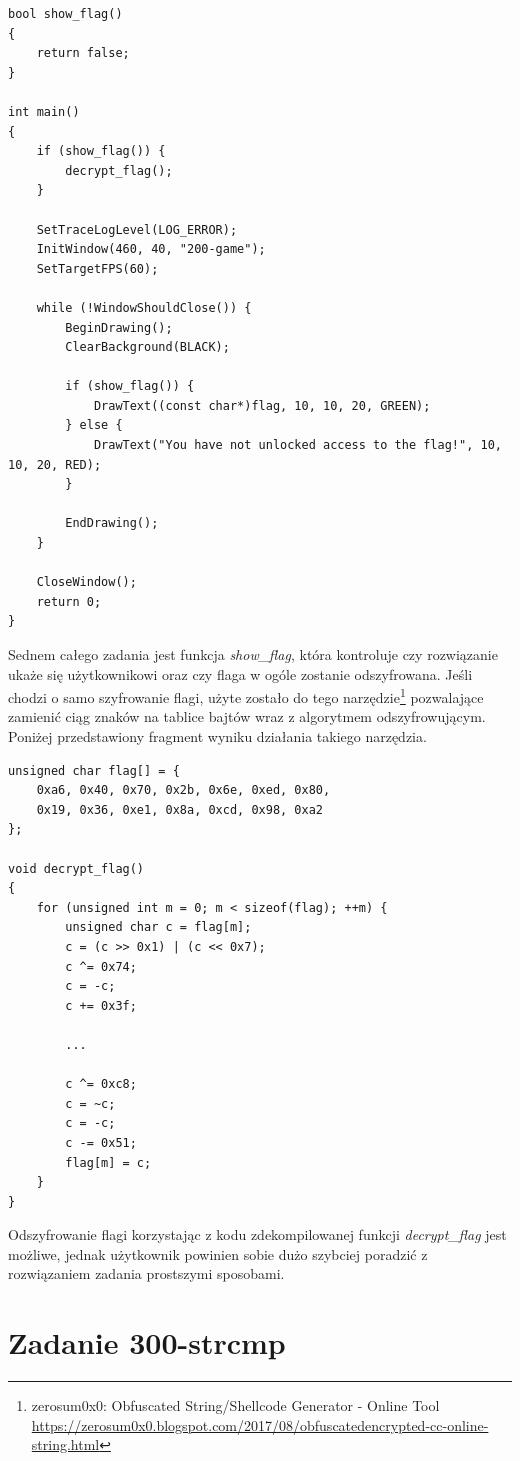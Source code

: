 \documentclass[language=polish,type=eng]{aghmodern}
\begin{document}
\begin{verbatim}
bool show_flag()
{
    return false;
}

int main()
{
    if (show_flag()) {
        decrypt_flag();
    }

    SetTraceLogLevel(LOG_ERROR);
    InitWindow(460, 40, "200-game");
    SetTargetFPS(60);

    while (!WindowShouldClose()) {
        BeginDrawing();
        ClearBackground(BLACK);

        if (show_flag()) {
            DrawText((const char*)flag, 10, 10, 20, GREEN);
        } else {
            DrawText("You have not unlocked access to the flag!", 10, 10, 20, RED);
        }

        EndDrawing();
    }

    CloseWindow();
    return 0;
}
\end{verbatim}

Sednem całego zadania jest funkcja \emph{show\_flag}, która kontroluje czy rozwiązanie
ukaże się użytkownikowi oraz czy flaga w ogóle zostanie odszyfrowana.
Jeśli chodzi o samo szyfrowanie flagi, użyte zostało do tego narzędzie\footnote{
zerosum0x0: Obfuscated String/Shellcode Generator - Online Tool
\url{https://zerosum0x0.blogspot.com/2017/08/obfuscatedencrypted-cc-online-string.html}}
pozwalające zamienić ciąg znaków na tablice bajtów wraz z algorytmem odszyfrowującym.
Poniżej przedstawiony fragment wyniku działania takiego narzędzia.

\begin{verbatim}
unsigned char flag[] = {
    0xa6, 0x40, 0x70, 0x2b, 0x6e, 0xed, 0x80,
    0x19, 0x36, 0xe1, 0x8a, 0xcd, 0x98, 0xa2
};

void decrypt_flag()
{
    for (unsigned int m = 0; m < sizeof(flag); ++m) {
        unsigned char c = flag[m];
        c = (c >> 0x1) | (c << 0x7);
        c ^= 0x74;
        c = -c;
        c += 0x3f;

        ...

        c ^= 0xc8;
        c = ~c;
        c = -c;
        c -= 0x51;
        flag[m] = c;
    }
}
\end{verbatim}

Odszyfrowanie flagi korzystając z kodu zdekompilowanej funkcji \emph{decrypt\_flag} jest możliwe,
jednak użytkownik powinien sobie dużo szybciej poradzić z rozwiązaniem zadania prostszymi
sposobami.

\section{Zadanie 300-strcmp}
\end{document}
